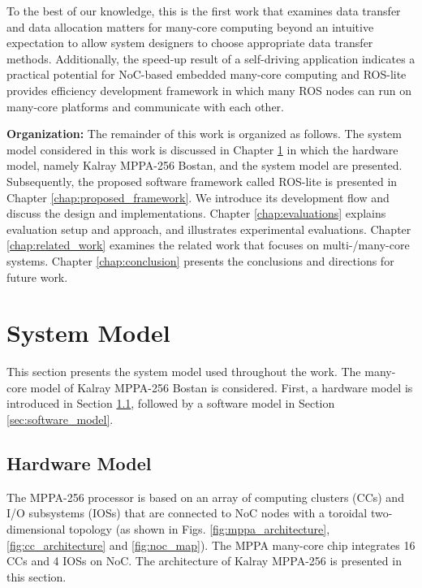 To the best of our knowledge, this is the first work that examines data transfer and data allocation matters for many-core computing beyond an intuitive expectation to allow system designers to choose appropriate data transfer methods.
Additionally, the speed-up result of a self-driving application indicates a practical potential for NoC-based embedded many-core computing and ROS-lite provides efficiency development framework in which many ROS nodes can run on many-core platforms and communicate with each other.

\textbf{Organization:}
The remainder of this work is organized as follows.
The system model considered in this work is discussed in Chapter \ref{chap:system_model} in which the hardware model, namely Kalray MPPA-256 Bostan, and the system model are presented.
Subsequently, the proposed software framework called ROS-lite is presented in Chapter \ref{chap:proposed_framework}.
We introduce its development flow and discuss the design and implementations.
Chapter \ref{chap:evaluations} explains evaluation setup and approach, and illustrates experimental evaluations.
Chapter \ref{chap:related_work} examines the related work that focuses on multi-/many-core systems.
Chapter \ref{chap:conclusion} presents the conclusions and directions for future work.


\chapter{System Model}
\label{chap:system_model}
This section presents the system model used throughout the work.
The many-core model of Kalray MPPA-256 Bostan is considered.
First, a hardware model is introduced in Section \ref{sec:hardware_model}, followed by a software model in Section \ref{sec:software_model}.

\section{Hardware Model}
\label{sec:hardware_model}
The MPPA-256 processor is based on an array of computing clusters (CCs) and I/O subsystems (IOSs) that are connected to NoC nodes with a toroidal two-dimensional topology 
(as shown in Figs. \ref{fig:mppa_architecture}, \ref{fig:cc_architecture} and \ref{fig:noc_map}).
The MPPA many-core chip integrates 16 CCs and 4 IOSs on NoC.
The architecture of Kalray MPPA-256 is presented in this section.


